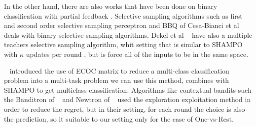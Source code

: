 In the other hand, there are also works that have been done on binary classification with partial feedback . 
Selective sampling algorithms such as first and second order selective sampling perceptron and   
BBQ  of Cesa-Bianci et al~\cite{cesa2006worst,cesa2009robust} deals with binary selective 
sampling algorithms. Dekel et al ~\cite{dekel2010robust} have also a multiple teachers selective sampling 
algorithm, whit setting that is similar to SHAMPO with $\kappa$ updates per round , but is force all of the 
inputs to be in the same space.

~\cite{dietterich1995solving} introduced the use of ECOC matrix to reduce a 
multi-class classification problem into a multi-task problem we can use this method, combines with 
SHAMPO to get multiclass classification. Algorithms like contextual bandits such the Banditron of 
~\cite{kakade2008efficient} and Newtron of ~\cite{hazan2011newtron}  used the 
exploration exploitation method in order to reduce the regret, but in their setting, for each round the choice 
is also the prediction, so it suitable to our setting only for the case of One-vs-Rest.
